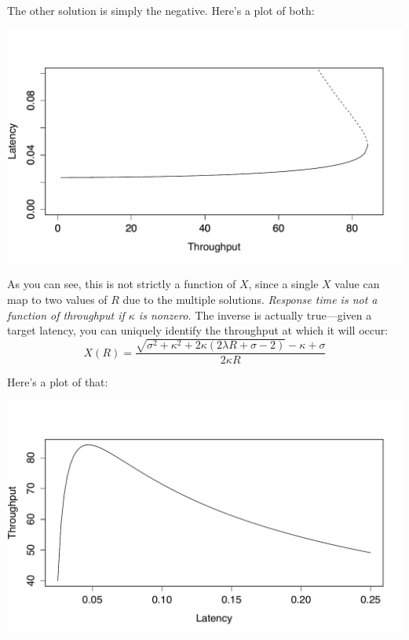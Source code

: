 \documentclass{vivid_layout}
\begin{document}
The other solution is simply the negative. Here's a plot of both:
\begin{center}
\includegraphics[width=.85\linewidth]{scalability/nose-equation}
\end{center}


As you can see, this is not strictly a function of $X$, since a single $X$ value
can map to two values of $R$ due to the multiple solutions. {\itshape Response
time is not a function of throughput if $\kappa$ is nonzero.} The inverse is
actually true---given a target latency, you can uniquely identify the throughput
at which it will occur:
\begin{equation}
X(R)=\frac{\sqrt{\sigma^2+\kappa^2+2\kappa(2\lambda R+\sigma-2)}-\kappa+\sigma}{2\kappa R}
\label{x_r}
\end{equation}

Here's a plot of that:
\begin{center}
\includegraphics[width=.85\linewidth]{scalability/x-function-r}
\end{center}
\end{document}
